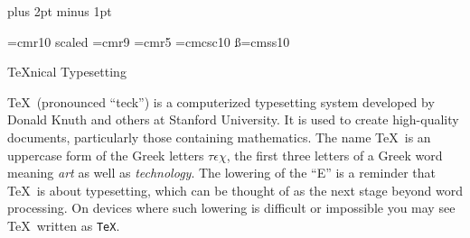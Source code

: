 

\hsize 6.3in                           %
\vsize 9.7in                           %

\parskip 8pt plus 2pt minus 1pt        %

\font\bigrm=cmr10 scaled      %
\font\ninerm=cmr9                      %
\font\fiverm=cmr5                      %
\font\sm=cmcsc10                       %
\font\ss=cmss10                        %

\def\subhead#1{\bigskip                %
               \noindent{\bf #1}\par   %
               \nobreak}               %

\centerline{\bigrm \TeX nical Typesetting}

\vskip 2.5cm                           %

\subhead{What is \TeX?}

\TeX\ (pronounced ``teck'') is a computerized typesetting system developed by
Donald Knuth and others at Stanford University.  It is used to create
high-quality documents, particularly those containing mathematics.
The name \TeX\ is an uppercase form of the Greek letters $\tau\epsilon\chi$,
the first three letters of a Greek word meaning {\sl art} as well as
{\sl technology}.
The lowering of the ``E'' is a reminder that \TeX\ is about typesetting,
which can be thought of as the next stage beyond word processing.
On devices where such lowering is difficult or impossible you may see \TeX\
written as {\tt TeX}.

